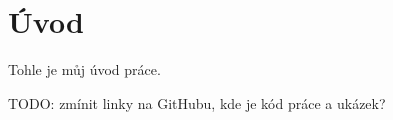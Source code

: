\chapter*{Úvod}

Tohle je můj úvod práce.

TODO: zmínit linky na GitHubu, kde je kód práce a ukázek?